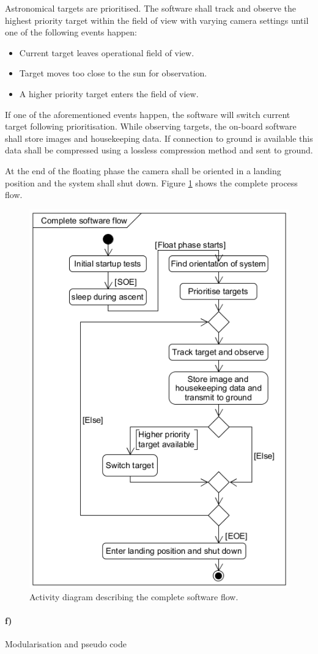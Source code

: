 Astronomical targets are prioritised. The software shall track and observe the highest priority target within the field of view with varying camera settings until one of the following events happen:

\begin{itemize}
	\item Current target leaves operational field of view.
	\item Target moves too close to the sun for observation.
	\item A higher priority target enters the field of view.
\end{itemize}

If one of the aforementioned events happen, the software will switch current target following prioritisation. While observing targets, the on-board software shall store images and housekeeping data. If connection to ground is available this data shall be compressed using a lossless compression method and sent to ground.

At the end of the floating phase the camera shall be oriented in a landing position and the system shall shut down. Figure \ref{fig:software-activity-diagram} shows the complete process flow.

\begin{figure}[H]
    \centering
    \includegraphics[width=.5\textwidth]{4-experiment-design/img/software/activity-diagram.png}
    \caption{Activity diagram describing the complete software flow.}
    \label{fig:software-activity-diagram}
\end{figure}

\newpage
\paragraph{f)} Modularisation and pseudo code\\

